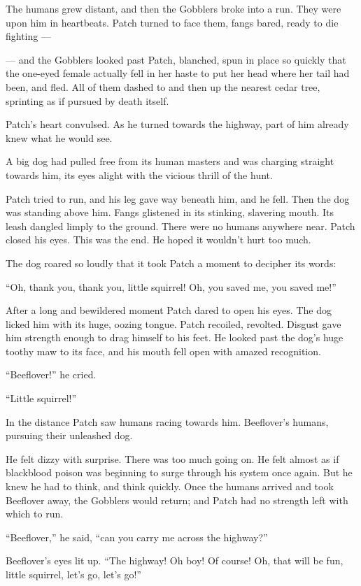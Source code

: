 \documentclass[ebook,oneside,openany,17pt]{memoir}
\begin{document}
The humans grew distant, and then the Gobblers broke into a run. They
were upon him in heartbeats. Patch turned to face them, fangs bared,
ready to die fighting —

— and the Gobblers looked past Patch, blanched, spun in place so
quickly that the one-eyed female actually fell in her haste to put her
head where her tail had been, and fled. All of them dashed to and then
up the nearest cedar tree, sprinting as if pursued by death itself.

Patch’s heart convulsed. As he turned towards the highway, part of him
already knew what he would see.

A big dog had pulled free from its human masters and was charging
straight towards him, its eyes alight with the vicious thrill of the
hunt.

Patch tried to run, and his leg gave way beneath him, and he
fell. Then the dog was standing above him. Fangs glistened in its
stinking, slavering mouth. Its leash dangled limply to the
ground. There were no humans anywhere near. Patch closed his
eyes. This was the end. He hoped it wouldn’t hurt too much.

The dog roared so loudly that it took Patch a moment to decipher its
words:

“Oh, thank you, thank you, little squirrel! Oh, you saved me, you
saved me!”

After a long and bewildered moment Patch dared to open his eyes. The
dog licked him with its huge, oozing tongue. Patch recoiled,
revolted. Disgust gave him strength enough to drag himself to his
feet. He looked past the dog’s huge toothy maw to its face, and his
mouth fell open with amazed recognition.

“Beeflover!” he cried.

“Little squirrel!”

In the distance Patch saw humans racing towards him. Beeflover’s
humans, pursuing their unleashed dog.

He felt dizzy with surprise. There was too much going on. He felt
almost as if blackblood poison was beginning to surge through his
system once again. But he knew he had to think, and think
quickly. Once the humans arrived and took Beeflover away, the Gobblers
would return; and Patch had no strength left with which to run.

“Beeflover,” he said, “can you carry me across the highway?”

Beeflover’s eyes lit up. “The highway! Oh boy! Of course! Oh, that
will be fun, little squirrel, let’s go, let’s go!”
\end{document}
